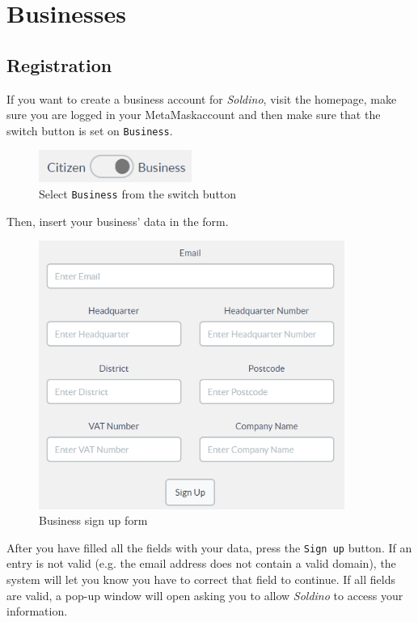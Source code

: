 \section{Businesses}
	\subsection{Registration}
	If you want to create a business account for \textit{Soldino}, visit the 
	homepage, make sure you are logged in your MetaMask\glosp account and
	then make sure that the switch button is set on \texttt{Business}.\\
	\begin{figure}[H]
		\includegraphics[width=5cm]{res/images/user_business.png}
		\centering
		\caption{Select \texttt{Business} from the switch button}
	\end{figure}	
	\noindent Then, insert your business' data in the form.
	\begin{figure}[H]
		\includegraphics[width=10cm]{res/images/business_signup.png}
		\centering
		\caption{Business sign up form}
	\end{figure}
	\noindent After you have filled all the fields with your data,
	press the \texttt{Sign up} button. If an entry is not valid (e.g. the email
	address does not contain a valid domain), the system will let you know 
	you have to correct that field to continue. If all fields are valid, a
	pop-up window will open asking you to allow \textit{Soldino} to access your
	information.\\
